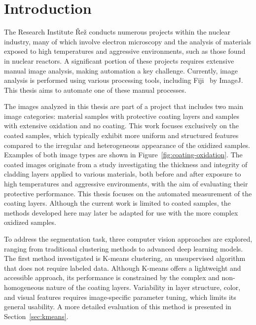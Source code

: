 \chapter{Introduction}

The Research Institute Řež conducts numerous projects within the nuclear industry, many of which involve electron microscopy and the analysis of materials exposed to high temperatures and aggressive environments, such as those found in nuclear reactors. A significant portion of these projects requires extensive manual image analysis, making automation a key challenge. Currently, image analysis is performed using various processing tools, including Fiji~\cite{Schindelin2012} by ImageJ. This thesis aims to automate one of these manual processes.

The images analyzed in this thesis are part of a project that includes two main image categories: material samples with protective coating layers and samples with extensive oxidation and no coating. This work focuses exclusively on the coated samples, which typically exhibit more uniform and structured features compared to the irregular and heterogeneous appearance of the oxidized samples. Examples of both image types are shown in Figure~\ref{fig:coating-oxidation}. The coated images originate from a study investigating the thickness and integrity of cladding layers applied to various materials, both before and after exposure to high temperatures and aggressive environments, with the aim of evaluating their protective performance. This thesis focuses on the automated measurement of the coating layers. Although the current work is limited to coated samples, the methods developed here may later be adapted for use with the more complex oxidized samples.


To address the segmentation task, three computer vision approaches are explored, ranging from traditional clustering methods to advanced deep learning models. The first method investigated is K-means clustering, an unsupervised algorithm that does not require labeled data. Although K-means offers a lightweight and accessible approach, its performance is constrained by the complex and non-homogeneous nature of the coating layers. Variability in layer structure, color, and visual features requires image-specific parameter tuning, which limits its general usability. A more detailed evaluation of this method is presented in Section~\ref{sec:kmeans}.



